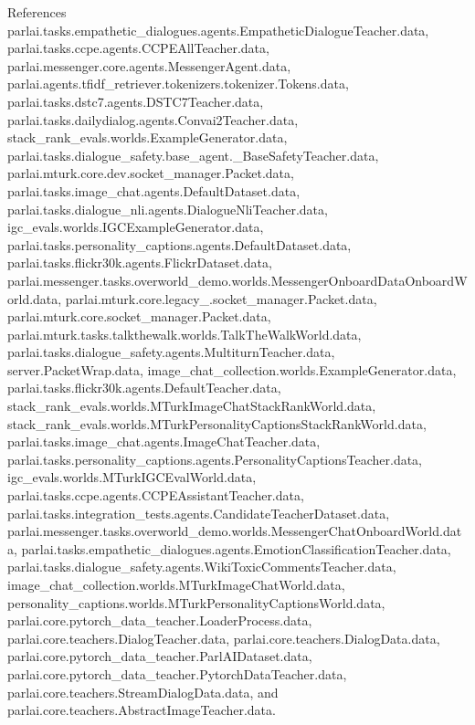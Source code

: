 References parlai.\+tasks.\+empathetic\+\_\+dialogues.\+agents.\+Empathetic\+Dialogue\+Teacher.\+data, parlai.\+tasks.\+ccpe.\+agents.\+C\+C\+P\+E\+All\+Teacher.\+data, parlai.\+messenger.\+core.\+agents.\+Messenger\+Agent.\+data, parlai.\+agents.\+tfidf\+\_\+retriever.\+tokenizers.\+tokenizer.\+Tokens.\+data, parlai.\+tasks.\+dstc7.\+agents.\+D\+S\+T\+C7\+Teacher.\+data, parlai.\+tasks.\+dailydialog.\+agents.\+Convai2\+Teacher.\+data, stack\+\_\+rank\+\_\+evals.\+worlds.\+Example\+Generator.\+data, parlai.\+tasks.\+dialogue\+\_\+safety.\+base\+\_\+agent.\+\_\+\+Base\+Safety\+Teacher.\+data, parlai.\+mturk.\+core.\+dev.\+socket\+\_\+manager.\+Packet.\+data, parlai.\+tasks.\+image\+\_\+chat.\+agents.\+Default\+Dataset.\+data, parlai.\+tasks.\+dialogue\+\_\+nli.\+agents.\+Dialogue\+Nli\+Teacher.\+data, igc\+\_\+evals.\+worlds.\+I\+G\+C\+Example\+Generator.\+data, parlai.\+tasks.\+personality\+\_\+captions.\+agents.\+Default\+Dataset.\+data, parlai.\+tasks.\+flickr30k.\+agents.\+Flickr\+Dataset.\+data, parlai.\+messenger.\+tasks.\+overworld\+\_\+demo.\+worlds.\+Messenger\+Onboard\+Data\+Onboard\+World.\+data, parlai.\+mturk.\+core.\+legacy\+\_.\+socket\+\_\+manager.\+Packet.\+data, parlai.\+mturk.\+core.\+socket\+\_\+manager.\+Packet.\+data, parlai.\+mturk.\+tasks.\+talkthewalk.\+worlds.\+Talk\+The\+Walk\+World.\+data, parlai.\+tasks.\+dialogue\+\_\+safety.\+agents.\+Multiturn\+Teacher.\+data, server.\+Packet\+Wrap.\+data, image\+\_\+chat\+\_\+collection.\+worlds.\+Example\+Generator.\+data, parlai.\+tasks.\+flickr30k.\+agents.\+Default\+Teacher.\+data, stack\+\_\+rank\+\_\+evals.\+worlds.\+M\+Turk\+Image\+Chat\+Stack\+Rank\+World.\+data, stack\+\_\+rank\+\_\+evals.\+worlds.\+M\+Turk\+Personality\+Captions\+Stack\+Rank\+World.\+data, parlai.\+tasks.\+image\+\_\+chat.\+agents.\+Image\+Chat\+Teacher.\+data, parlai.\+tasks.\+personality\+\_\+captions.\+agents.\+Personality\+Captions\+Teacher.\+data, igc\+\_\+evals.\+worlds.\+M\+Turk\+I\+G\+C\+Eval\+World.\+data, parlai.\+tasks.\+ccpe.\+agents.\+C\+C\+P\+E\+Assistant\+Teacher.\+data, parlai.\+tasks.\+integration\+\_\+tests.\+agents.\+Candidate\+Teacher\+Dataset.\+data, parlai.\+messenger.\+tasks.\+overworld\+\_\+demo.\+worlds.\+Messenger\+Chat\+Onboard\+World.\+data, parlai.\+tasks.\+empathetic\+\_\+dialogues.\+agents.\+Emotion\+Classification\+Teacher.\+data, parlai.\+tasks.\+dialogue\+\_\+safety.\+agents.\+Wiki\+Toxic\+Comments\+Teacher.\+data, image\+\_\+chat\+\_\+collection.\+worlds.\+M\+Turk\+Image\+Chat\+World.\+data, personality\+\_\+captions.\+worlds.\+M\+Turk\+Personality\+Captions\+World.\+data, parlai.\+core.\+pytorch\+\_\+data\+\_\+teacher.\+Loader\+Process.\+data, parlai.\+core.\+teachers.\+Dialog\+Teacher.\+data, parlai.\+core.\+teachers.\+Dialog\+Data.\+data, parlai.\+core.\+pytorch\+\_\+data\+\_\+teacher.\+Parl\+A\+I\+Dataset.\+data, parlai.\+core.\+pytorch\+\_\+data\+\_\+teacher.\+Pytorch\+Data\+Teacher.\+data, parlai.\+core.\+teachers.\+Stream\+Dialog\+Data.\+data, and parlai.\+core.\+teachers.\+Abstract\+Image\+Teacher.\+data.

